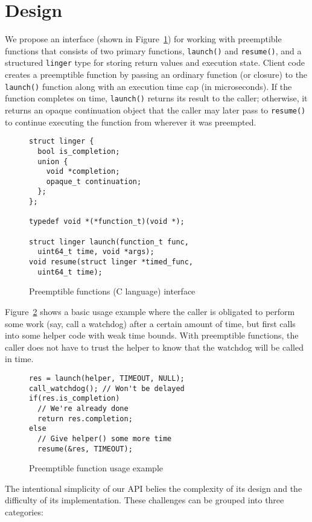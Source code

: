 \section{Design}

We propose an interface (shown in Figure~\ref{fig:interface}) for working with
preemptible functions that consists of two primary functions, \texttt{launch()} and
\texttt{resume()}, and a structured \texttt{linger} type for storing return values
and execution state.  Client code creates a preemptible function by passing an
ordinary function (or closure) to the \texttt{launch()} function along with an
execution time cap (in microseconds).  If the function completes on time,
\texttt{launch()} returns its result to the caller; otherwise, it returns an opaque
continuation object that the caller may later pass to \texttt{resume()} to continue
executing the function from wherever it was preempted.

\begin{figure}
\begin{verbatim}
struct linger {
  bool is_completion;
  union {
    void *completion;
    opaque_t continuation;
  };
};

typedef void *(*function_t)(void *);

struct linger launch(function_t func,
  uint64_t time, void *args);
void resume(struct linger *timed_func,
  uint64_t time);
\end{verbatim}
\caption{Preemptible functions (C language) interface}
\label{fig:interface}
\end{figure}

Figure~\ref{fig:usage} shows a basic usage example where the caller is obligated to
perform some work (say, call a watchdog) after a certain amount of time, but first
calls into some helper code with weak time bounds.  With preemptible functions,
the caller does not have to trust the helper to know that the watchdog will be called
in time.

\begin{figure}
\begin{verbatim}
res = launch(helper, TIMEOUT, NULL);
call_watchdog(); // Won't be delayed
if(res.is_completion)
  // We're already done
  return res.completion;
else
  // Give helper() some more time
  resume(&res, TIMEOUT);
\end{verbatim}
\caption{Preemptible function usage example}
\label{fig:usage}
\end{figure}

The intentional simplicity of our API belies the complexity of its design and the
difficulty of its implementation.  These challenges can be grouped into three
categories:

